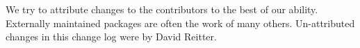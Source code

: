 \documentclass[11pt,letterpaper]{article}
\begin{document}
{\begin{figure*}[!b]
{\begin{minipage}{0.95\textwidth}
We try to attribute changes to the contributors to the best of our
ability. Externally maintained packages are often the work of many
others. Un-attributed changes in this change log were by David Reitter.

\vspace{8pt}
\end{minipage}
~~}
\end{figure*}
}



\end{document}
